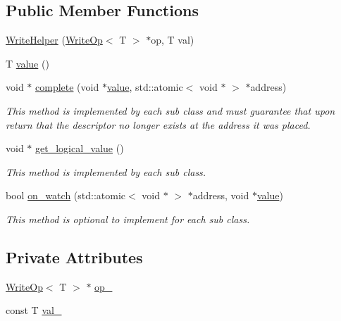 \subsection*{Public Member Functions}
\begin{DoxyCompactItemize}
\item 
\hyperlink{classtervel_1_1containers_1_1wf_1_1vector_1_1_write_helper_aac69263d3e2c63fb2e5523042df4e627}{Write\+Helper} (\hyperlink{classtervel_1_1containers_1_1wf_1_1vector_1_1_write_op}{Write\+Op}$<$ T $>$ $\ast$op, T val)
\item 
T \hyperlink{classtervel_1_1containers_1_1wf_1_1vector_1_1_write_helper_a386891ae1b288469cc40e798289026fb}{value} ()
\item 
void $\ast$ \hyperlink{classtervel_1_1containers_1_1wf_1_1vector_1_1_write_helper_a379b580d78358bf8332119541d8e87c0}{complete} (void $\ast$\hyperlink{classtervel_1_1containers_1_1wf_1_1vector_1_1_write_helper_a386891ae1b288469cc40e798289026fb}{value}, std\+::atomic$<$ void $\ast$ $>$ $\ast$address)
\begin{DoxyCompactList}\small\item\em This method is implemented by each sub class and must guarantee that upon return that the descriptor no longer exists at the address it was placed. \end{DoxyCompactList}\item 
void $\ast$ \hyperlink{classtervel_1_1containers_1_1wf_1_1vector_1_1_write_helper_ae2c93c4fb9304dd82c25f5d8d9b23487}{get\+\_\+logical\+\_\+value} ()
\begin{DoxyCompactList}\small\item\em This method is implemented by each sub class. \end{DoxyCompactList}\item 
bool \hyperlink{classtervel_1_1containers_1_1wf_1_1vector_1_1_write_helper_a4c914b2218dfcfffaae66e85ff77e6df}{on\+\_\+watch} (std\+::atomic$<$ void $\ast$ $>$ $\ast$address, void $\ast$\hyperlink{classtervel_1_1containers_1_1wf_1_1vector_1_1_write_helper_a386891ae1b288469cc40e798289026fb}{value})
\begin{DoxyCompactList}\small\item\em This method is optional to implement for each sub class. \end{DoxyCompactList}\end{DoxyCompactItemize}
\subsection*{Private Attributes}
\begin{DoxyCompactItemize}
\item 
\hyperlink{classtervel_1_1containers_1_1wf_1_1vector_1_1_write_op}{Write\+Op}$<$ T $>$ $\ast$ \hyperlink{classtervel_1_1containers_1_1wf_1_1vector_1_1_write_helper_a4e3aac7ec85299353af06f639f1ce49e}{op\+\_\+}
\item 
const T \hyperlink{classtervel_1_1containers_1_1wf_1_1vector_1_1_write_helper_a5ccc8c44a16ff3d33c5472d0f149c771}{val\+\_\+}
\end{DoxyCompactItemize}
